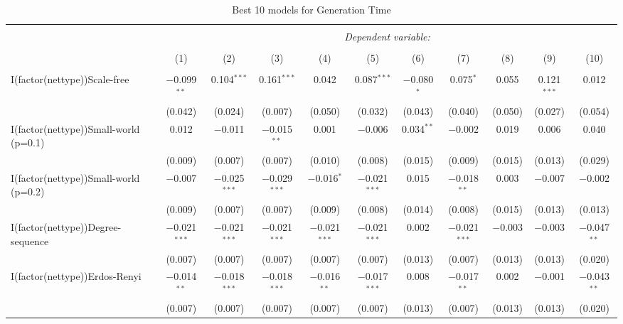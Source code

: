 
\begin{table}[!htbp] \centering 
  \caption{Best 10 models for Generation Time} 
  \label{tab:best_models_gentime} 
\begin{tabular}{@{\extracolsep{5pt}}lcccccccccc} 
\\[-1.8ex]\hline 
\hline \\[-1.8ex] 
 & \multicolumn{10}{c}{\textit{Dependent variable:}} \\ 
\cline{2-11} 
\\[-1.8ex] & (1) & (2) & (3) & (4) & (5) & (6) & (7) & (8) & (9) & (10)\\ 
\hline \\[-1.8ex] 
 I(factor(nettype))Scale-free & $-$0.099$^{**}$ & 0.104$^{***}$ & 0.161$^{***}$ & 0.042 & 0.087$^{***}$ & $-$0.080$^{*}$ & 0.075$^{*}$ & 0.055 & 0.121$^{***}$ & 0.012 \\ 
  & (0.042) & (0.024) & (0.007) & (0.050) & (0.032) & (0.043) & (0.040) & (0.050) & (0.027) & (0.054) \\ 
  I(factor(nettype))Small-world (p=0.1) & 0.012 & $-$0.011 & $-$0.015$^{**}$ & 0.001 & $-$0.006 & 0.034$^{**}$ & $-$0.002 & 0.019 & 0.006 & 0.040 \\ 
  & (0.009) & (0.007) & (0.007) & (0.010) & (0.008) & (0.015) & (0.009) & (0.015) & (0.013) & (0.029) \\ 
  I(factor(nettype))Small-world (p=0.2) & $-$0.007 & $-$0.025$^{***}$ & $-$0.029$^{***}$ & $-$0.016$^{*}$ & $-$0.021$^{***}$ & 0.015 & $-$0.018$^{**}$ & 0.003 & $-$0.007 & $-$0.002 \\ 
  & (0.009) & (0.007) & (0.007) & (0.009) & (0.008) & (0.014) & (0.008) & (0.015) & (0.013) & (0.013) \\ 
  I(factor(nettype))Degree-sequence & $-$0.021$^{***}$ & $-$0.021$^{***}$ & $-$0.021$^{***}$ & $-$0.021$^{***}$ & $-$0.021$^{***}$ & 0.002 & $-$0.021$^{***}$ & $-$0.003 & $-$0.003 & $-$0.047$^{**}$ \\ 
  & (0.007) & (0.007) & (0.007) & (0.007) & (0.007) & (0.013) & (0.007) & (0.013) & (0.013) & (0.020) \\ 
  I(factor(nettype))Erdos-Renyi & $-$0.014$^{**}$ & $-$0.018$^{***}$ & $-$0.018$^{***}$ & $-$0.016$^{**}$ & $-$0.017$^{***}$ & 0.008 & $-$0.017$^{**}$ & 0.002 & $-$0.001 & $-$0.043$^{**}$ \\ 
  & (0.007) & (0.007) & (0.007) & (0.007) & (0.007) & (0.013) & (0.007) & (0.013) & (0.013) & (0.020) \\ 

\end{tabular}
\end{table}
